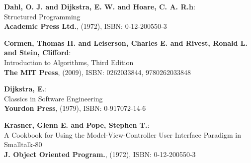\documentclass[
]{elteikthesis}[2023/04/10]
\begin{document}
{}
\begin{thebibliography}{0}

	\textbf{Dahl, O. J. and Dijkstra, E. W. and Hoare, C. A. R.h}:\\
	Structured Programming\\
	\textbf{Academic Press Ltd.}, (1972), ISBN: 0-12-200550-3

	\textbf{Cormen, Thomas H. and Leiserson, Charles E. and Rivest, Ronald L. and Stein, Clifford}:\\
	Introduction to Algorithms, Third Edition\\
	\textbf{The MIT Press}, (2009), ISBN: 0262033844, 9780262033848

	\textbf{Dijkstra, E.}:\\
	Classics in Software Engineering\\
	\textbf{Yourdon Press}, (1979), ISBN: 0-917072-14-6

	\textbf{Krasner, Glenn E. and Pope, Stephen T.}:\\
	A Cookbook for Using the Model-View-Controller User Interface Paradigm in Smalltalk-80\\
	\textbf{J. Object Oriented Program.}, (1972), ISBN: 0-12-200550-3

\end{thebibliography}
\cleardoublepage





\end{document}
